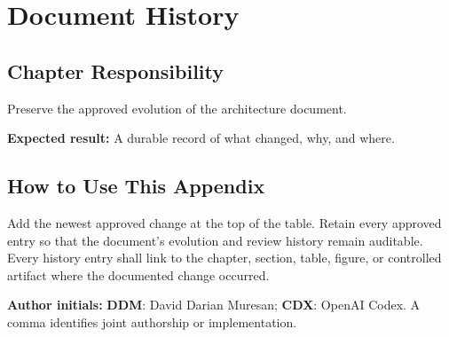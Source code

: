 \chapter{Document History}
\section{Chapter Responsibility}
\label{Section:DocumentHistoryResponsibility}
Preserve the approved evolution of the architecture document.

\noindent\textbf{Expected result:} A durable record of what changed, why, and where.

\section{How to Use This Appendix}
Add the newest approved change at the top of the table. Retain every approved
entry so that the document's evolution and review history remain auditable.
Every history entry shall link to the chapter, section, table, figure, or
controlled artifact where the documented change occurred.

\noindent\textbf{Author initials:} \textbf{DDM}: David Darian Muresan;
\textbf{CDX}: OpenAI Codex. A comma identifies joint authorship or implementation.

